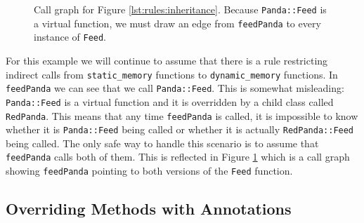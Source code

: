 \begin{figure}
    \centering
    \caption{Call graph for Figure \ref{lst:rules:inheritance}.  Because \lstinline{Panda::Feed} is a virtual function, we must draw an edge from \lstinline{feedPanda} to every instance of \lstinline{Feed}.}
    \label{fig:rules:inheritance}
\end{figure}

For this example we will continue to assume that there is a rule restricting indirect calls from \lstinline{static_memory} functions to \lstinline{dynamic_memory} functions.  In \lstinline{feedPanda} we can see that we call \lstinline{Panda::Feed}.  This is somewhat misleading:  \lstinline{Panda::Feed} is a virtual function and it is overridden by a child class called \lstinline{RedPanda}.  This means that any time \lstinline{feedPanda} is called, it is impossible to know whether it is \lstinline{Panda::Feed} being called or whether it is actually \lstinline{RedPanda::Feed} being called.  The only safe way to handle this scenario is to assume that \lstinline{feedPanda} calls both of them.  This is reflected in Figure \ref{fig:rules:inheritance} which is a call graph showing \lstinline{feedPanda} pointing to both versions of the \lstinline{Feed} function.  

\subsection{Overriding Methods with Annotations}

